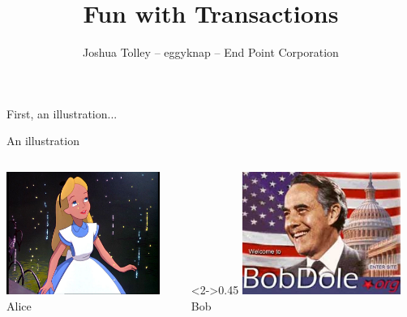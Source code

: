 \documentclass[svgnames]{beamer}
\begin{document}
\title{Fun with Transactions}
\author{Joshua Tolley -- eggyknap -- End Point Corporation}

\frame{\titlepage}

\begin{frame}
    \begin{centering}
    First, an illustration...
    \par
    \end{centering}
\end{frame}
\begin{frame}{An illustration}
    \begin{columns}[t]
        \begin{column}{0.45\textwidth}
            \includegraphics[height=4cm]{alice-9.jpg}
            \\ Alice
        \end{column}
        \begin{column}<2->{0.45\textwidth}
            \includegraphics[height=4cm]{bobdole_org.jpg}
            \\ Bob
        \end{column}
    \end{columns}
    \vspace{10pt}
\end{frame}
\end{document}
